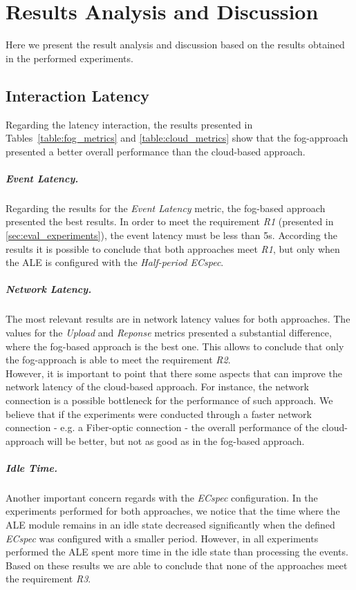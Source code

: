         \section{Results Analysis and Discussion}
        \label{sec:eval_analysis}
        Here we present the result analysis and discussion based on the results obtained in the performed
        experiments.

        \subsection{Interaction Latency}
        \label{subs:eval_results_latency}
        Regarding the latency interaction, the results presented in Tables~\ref{table:fog_metrics} and
        \ref{table:cloud_metrics} show that the fog-approach presented a better overall performance than
        the cloud-based approach.

        \subparagraph{Event Latency.}
        \label{subp:eval_event_latency}
        Regarding the results for the \textit{Event Latency} metric, the fog-based approach presented the
        best results. In order to meet the requirement \textit{R1} (presented in \ref{sec:eval_experiments}),
        the event latency must be less than 5s. According the results it is possible to conclude that both
        approaches meet \textit{R1}, but only when the \gls{ALE} is configured with the \textit{Half-period ECspec}.

        \subparagraph{Network Latency.}
        \label{subp:eval_network_latency}
        The most relevant results are in network latency values for both approaches. The values for the \textit{Upload}
        and \textit{Reponse} metrics presented a substantial difference, where the fog-based approach is the
        best one. This allows to conclude that only the fog-approach is able to meet the requirement \textit{R2}.\\

        However, it is important to point that there some aspects that can improve the network latency
        of the cloud-based approach. For instance, the network connection is a possible bottleneck for the
        performance of such approach. We believe that if the experiments were conducted through a faster
        network connection - e.g. a Fiber-optic connection - the overall performance of the cloud-approach
        will be better, but not as good as in the fog-based approach.

        \subparagraph{Idle Time.}
        \label{subp:eval_idle_time}
        Another important concern regards with the \textit{ECspec} configuration. In the experiments
        performed for both approaches, we notice that the time where the \gls{ALE} module remains in an idle
        state decreased significantly when the defined \textit{ECspec} was configured with a smaller period.
        However, in all experiments performed the \gls{ALE} spent more time in the idle state than
        processing the events. Based on these results we are able to conclude that none of the approaches
        meet the requirement \textit{R3}.

